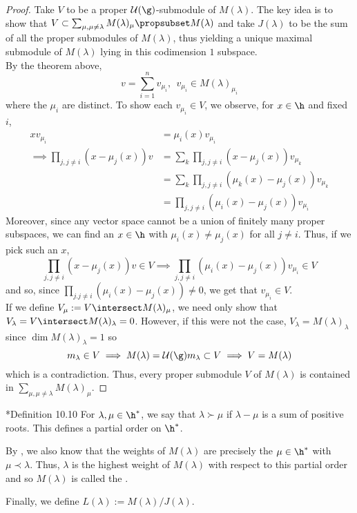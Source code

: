 \documentclass[11pt,leqno,oneside]{amsart}
\numberwithin{thm}{section}
\newcommand{\U}{\mathcal{U}}
\begin{document}
\begin{proof}
  Take \(V\) to be a proper \(\U(\g)\)-submodule of
  \(M(\lambda)\). The key idea is to show that \(V 
  \subset \sum_{\mu, \mu \neq \lambda} M(\lambda)_\mu \propsubset
  M(\lambda)\) and take \(J(\lambda)\) to be the sum of all the proper
  submodules of \(M(\lambda)\), thus yielding a unique maximal
  submodule of \(M(\lambda)\) lying in this codimension \(1\)
  subspace. \\

  By the theorem above, \[
    v = \sum_{i=1}^n v_{\mu_i}, \ \ v_{\mu_i} \in M(\lambda)_{\mu_i}
  \]
  where the \(\mu_i\) are distinct. To show each \(v_{\mu_i} \in V\),
  we observe, for \(x \in \h\) and fixed \(i\),
  \begin{align*}
    xv_{\mu_i}
    & = \mu_i(x) v_{\mu_i} \\
    \implies \prod_{j, j \neq i} (x-\mu_j(x))v 
    & = \sum_k \prod_{j, j \neq i} (x-\mu_j(x))v_{\mu_k} \\
    & = \sum_k \prod_{j, j \neq i} (\mu_k(x)-\mu_j(x))v_{\mu_k}\\
    & = \prod_{j, j \neq i} (\mu_i(x)-\mu_j(x))v_{\mu_i}
  \end{align*}
  Moreover, since any vector space cannot be a union of finitely many
  proper subspaces, we can find an \(x \in \h\) with \(\mu_i(x) \neq
  \mu_j(x)\) for all \(j \neq i\). Thus, if we pick such an \(x\), \[
    \prod_{j, j\neq i} (x-\mu_j(x)) v \in V \implies \prod_{j,j\neq
      i}(\mu_i(x)-\mu_j(x)) v_{\mu_i} \in V
  \]
  and so, since \(\prod_{j. j\neq i} (\mu_i(x) - \mu_j(x)) \neq 0\),
  we get that \(v_{\mu_i} \in V\). \\

  If we define \(V_\mu := V \intersect M(\lambda)_\mu\), we need only
  show that \(V_\lambda = V \intersect M(\lambda)_\lambda =
  0\). However, if this were not the case, \(V_\lambda =
  M(\lambda)_\lambda\) since \(\dim M(\lambda)_\lambda = 1\) so
  \[
    m_\lambda \in V \implies M(\lambda) = \U(\g)m_\lambda \subset V
    \implies V = M(\lambda)
  \]
  which is a contradiction. Thus, every proper submodule \(V\) of
  \(M(\lambda)\) is contained in \(\sum_{\mu, \mu \neq \lambda}
  M(\lambda)_\mu\). 
\end{proof}
\begin{defn}
  \cite{carter}*{Definition 10.10} For \(\lambda,\mu \in \h^*\), we
  say that \(\lambda \succ \mu\) if \(\lambda-\mu\) is a sum of
  positive roots. This defines a partial order on \(\h^*\).

  By , we also know that the weights of \(M(\lambda)\) are precisely
  the \(\mu \in \h^*\) with \(\mu \prec \lambda\). Thus, \(\lambda\)
  is the highest weight of \(M(\lambda)\) with respect to this partial
  order and so \(M(\lambda)\) is called the .

  Finally, we define \(L(\lambda) := M(\lambda)/J(\lambda)\). 
\end{defn}
\end{document}
